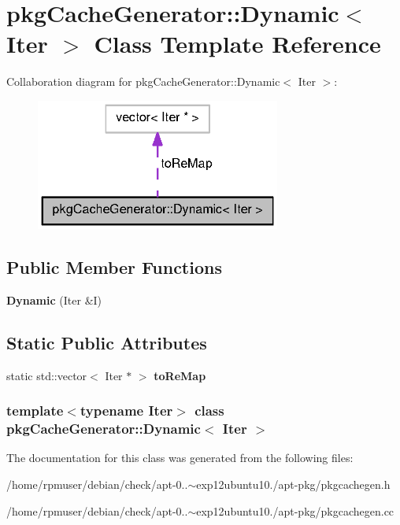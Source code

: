 \section{pkg\-Cache\-Generator\-:\-:\-Dynamic$<$ \-Iter $>$ \-Class \-Template \-Reference}
\label{classpkgCacheGenerator_1_1Dynamic}


\-Collaboration diagram for pkg\-Cache\-Generator\-:\-:\-Dynamic$<$ \-Iter $>$\-:
\nopagebreak
\begin{figure}[H]
\begin{center}
\leavevmode
\includegraphics[width=228pt]{classpkgCacheGenerator_1_1Dynamic__coll__graph}
\end{center}
\end{figure}
\subsection*{\-Public \-Member \-Functions}
\begin{DoxyCompactItemize}
\item 
{\bfseries \-Dynamic} (\-Iter \&\-I)\label{classpkgCacheGenerator_1_1Dynamic_abaee62ef9847b60e3795fa44e7657634}

\end{DoxyCompactItemize}
\subsection*{\-Static \-Public \-Attributes}
\begin{DoxyCompactItemize}
\item 
static std\-::vector$<$ \-Iter $\ast$ $>$ {\bfseries to\-Re\-Map}\label{classpkgCacheGenerator_1_1Dynamic_a05b7e4da937226e6d24f4b079749fb6c}

\end{DoxyCompactItemize}
\subsubsection*{template$<$typename \-Iter$>$ class pkg\-Cache\-Generator\-::\-Dynamic$<$ Iter $>$}



\-The documentation for this class was generated from the following files\-:\begin{DoxyCompactItemize}
\item 
/home/rpmuser/debian/check/apt-\/0..$\sim$exp12ubuntu10./apt-\/pkg/pkgcachegen.\-h\item 
/home/rpmuser/debian/check/apt-\/0..$\sim$exp12ubuntu10./apt-\/pkg/pkgcachegen.\-cc\end{DoxyCompactItemize}
